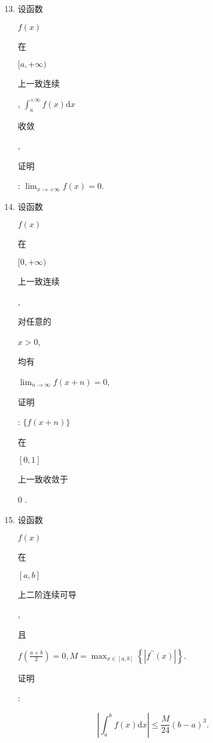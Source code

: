 \documentclass[10pt]{article}
\begin{document}
\begin{enumerate}
  \setcounter{enumi}{12}
  \item \begin{CJK}{UTF8}{mj}设函数\end{CJK} $f(x)$ \begin{CJK}{UTF8}{mj}在\end{CJK} $[a,+\infty)$ \begin{CJK}{UTF8}{mj}上一致连续\end{CJK}, $\int_{a}^{+\infty} f(x) \mathrm{d} x$ \begin{CJK}{UTF8}{mj}收敛\end{CJK}, \begin{CJK}{UTF8}{mj}证明\end{CJK}: $\lim _{x \rightarrow+\infty} f(x)=0$.

  \item \begin{CJK}{UTF8}{mj}设函数\end{CJK} $f(x)$ \begin{CJK}{UTF8}{mj}在\end{CJK} $[0,+\infty)$ \begin{CJK}{UTF8}{mj}上一致连续\end{CJK}, \begin{CJK}{UTF8}{mj}对任意的\end{CJK} $x>0$, \begin{CJK}{UTF8}{mj}均有\end{CJK} $\lim _{n \rightarrow \infty} f(x+n)=0$, \begin{CJK}{UTF8}{mj}证明\end{CJK}: $\{f(x+n)\}$ \begin{CJK}{UTF8}{mj}在\end{CJK} $[0,1]$ \begin{CJK}{UTF8}{mj}上一致收敛于\end{CJK} 0 .

  \item \begin{CJK}{UTF8}{mj}设函数\end{CJK} $f(x)$ \begin{CJK}{UTF8}{mj}在\end{CJK} $[a, b]$ \begin{CJK}{UTF8}{mj}上二阶连续可导\end{CJK}, \begin{CJK}{UTF8}{mj}且\end{CJK} $f\left(\frac{a+b}{2}\right)=0, M=\max _{x \in[a, b]}\left\{\left|f^{\prime \prime}(x)\right|\right\}$. \begin{CJK}{UTF8}{mj}证明\end{CJK}:

\end{enumerate}
$$
\left|\int_{a}^{b} f(x) \mathrm{d} x\right| \leqslant \frac{M}{24}(b-a)^{3} \text {. }
$$
\end{document}
